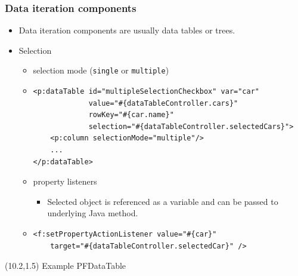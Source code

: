 \documentclass[10pt,xcolor=pdflatex]{beamer}
\begin{document}
\begin{frame}[containsverbatim]\frametitle{Data iteration components}
  \begin{itemize}
    \item Data iteration components are usually data tables or trees.
	\item Selection
      \begin{itemize}
    	\item selection mode (\texttt{single} or \texttt{multiple})
        \item[] \begin{footnotesize} \begin{verbatim}
<p:dataTable id="multipleSelectionCheckbox" var="car"
             value="#{dataTableController.cars}" 
             rowKey="#{car.name}"
             selection="#{dataTableController.selectedCars}">
    <p:column selectionMode="multiple"/>
    ...
</p:dataTable>    	
  \end{verbatim} \end{footnotesize}
    	\item property listeners
          \begin{itemize}
            \item Selected object is referenced as a variable and can be passed to underlying Java method.
          \end{itemize}
        \item[] \begin{footnotesize} \begin{verbatim}
<f:setPropertyActionListener value="#{car}"
    target="#{dataTableController.selectedCar}" />    
  \end{verbatim}
    \end{footnotesize}
      \end{itemize}
  \end{itemize}
\begin{textblock}{10}(10.2,1.5)
    {\footnotesize Example PFDataTable}
\end{textblock}
\end{frame}
\end{document}
